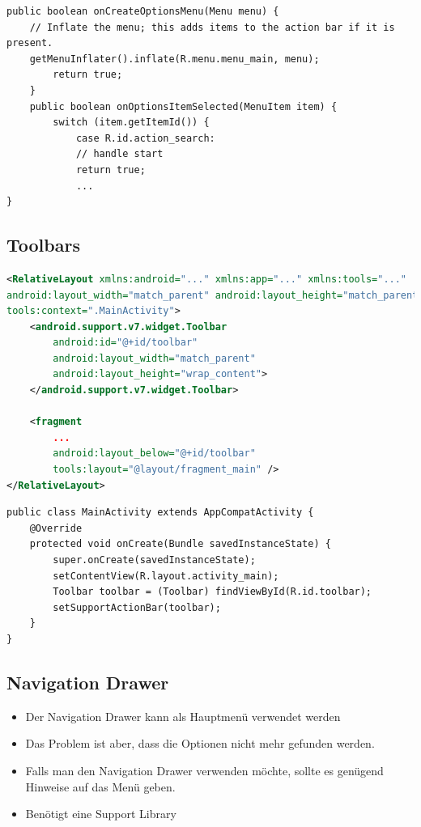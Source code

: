 \begin{lstlisting}[caption=Menue]
public boolean onCreateOptionsMenu(Menu menu) {
	// Inflate the menu; this adds items to the action bar if it is present.
	getMenuInflater().inflate(R.menu.menu_main, menu);
		return true;
	}
	public boolean onOptionsItemSelected(MenuItem item) {
		switch (item.getItemId()) {
			case R.id.action_search:
			// handle start
			return true;
			...
}
\end{lstlisting}

\subsection{Toolbars}
\begin{lstlisting}[caption=Toolbar in XML, language=XML]
<RelativeLayout xmlns:android="..." xmlns:app="..." xmlns:tools="..."
android:layout_width="match_parent" android:layout_height="match_parent"
tools:context=".MainActivity">
	<android.support.v7.widget.Toolbar
		android:id="@+id/toolbar"
		android:layout_width="match_parent"
		android:layout_height="wrap_content">
	</android.support.v7.widget.Toolbar>

	<fragment 
		...
		android:layout_below="@+id/toolbar"
		tools:layout="@layout/fragment_main" />
</RelativeLayout>
\end{lstlisting}

\begin{lstlisting}[caption=Toolbar verwenden]
public class MainActivity extends AppCompatActivity {
	@Override
	protected void onCreate(Bundle savedInstanceState) {
		super.onCreate(savedInstanceState);
		setContentView(R.layout.activity_main);
		Toolbar toolbar = (Toolbar) findViewById(R.id.toolbar);
		setSupportActionBar(toolbar);
	}
}
\end{lstlisting}

\subsection{Navigation Drawer}
\begin{itemize}
	\item Der Navigation Drawer kann als Hauptmenü verwendet werden
	\item Das Problem ist aber, dass die Optionen nicht mehr gefunden werden.
	\item Falls man den Navigation Drawer verwenden möchte, sollte es genügend Hinweise auf das Menü geben.
	\item Benötigt eine Support Library
\end{itemize}

